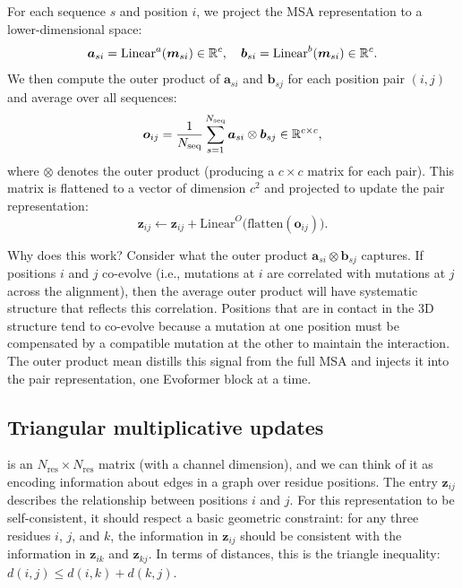 For each sequence $s$ and position $i$, we project the MSA representation to a lower-dimensional space:
\begin{equation}
\label{eq:opm-proj}
\bm{a}_{si} = \text{Linear}^a(\bm{m}_{si}) \in \mathbb{R}^c, \quad
\bm{b}_{si} = \text{Linear}^b(\bm{m}_{si}) \in \mathbb{R}^c.
\end{equation}
We then compute the outer product of $\bm{a}_{si}$ and $\bm{b}_{sj}$ for each position pair $(i,j)$ and average over all sequences:
\begin{equation}
\label{eq:opm}
\bm{o}_{ij} = \frac{1}{N_\text{seq}} \sum_{s=1}^{N_\text{seq}} \bm{a}_{si} \otimes \bm{b}_{sj} \in \mathbb{R}^{c \times c},
\end{equation}
where $\otimes$ denotes the outer product (producing a $c \times c$ matrix for each pair).
This matrix is flattened to a vector of dimension $c^2$ and projected to update the pair representation:
\begin{equation}
\label{eq:opm-update}
\bm{z}_{ij} \leftarrow \bm{z}_{ij} + \text{Linear}^O\!\bigl(\text{flatten}(\bm{o}_{ij})\bigr).
\end{equation}

Why does this work?
Consider what the outer product $\bm{a}_{si} \otimes \bm{b}_{sj}$ captures.
If positions $i$ and $j$ co-evolve (i.e., mutations at $i$ are correlated with mutations at $j$ across the alignment), then the average outer product will have systematic structure that reflects this correlation.
Positions that are in contact in the 3D structure tend to co-evolve because a mutation at one position must be compensated by a compatible mutation at the other to maintain the interaction.
The outer product mean distills this signal from the full MSA and injects it into the pair representation, one Evoformer block at a time.

\subsection*{Triangular multiplicative updates}
\label{sec:af2-tri-mult}

 is an $N_\text{res} \times N_\text{res}$ matrix (with a channel dimension), and we can think of it as encoding information about edges in a graph over residue positions.
The entry $\bm{z}_{ij}$ describes the relationship between positions $i$ and $j$.
For this representation to be self-consistent, it should respect a basic geometric constraint: for any three residues $i$, $j$, and $k$, the information in $\bm{z}_{ij}$ should be consistent with the information in $\bm{z}_{ik}$ and $\bm{z}_{kj}$.
In terms of distances, this is the triangle inequality: $d(i,j) \leq d(i,k) + d(k,j)$.

